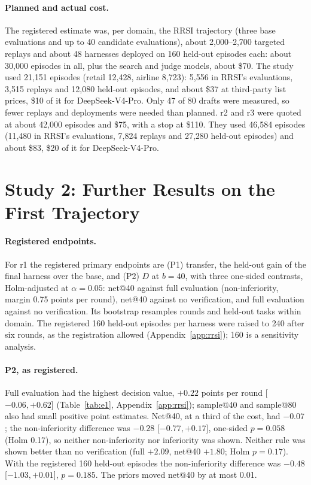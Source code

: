 \documentclass[11pt]{article}
\begin{document}
\paragraph{Planned and actual cost.} The registered estimate was, per domain, the RRSI trajectory (three base evaluations and up to 40 candidate evaluations), about 2{,}000--2{,}700 targeted replays and about 48 harnesses deployed on 160 held-out episodes each: about 30{,}000 episodes in all, plus the search and judge models, about \$70. The study used 21{,}151 episodes (retail 12{,}428, airline 8{,}723): 5{,}556 in RRSI's evaluations, 3{,}515 replays and 12{,}080 held-out episodes, and about \$37 at third-party list prices, \$10 of it for DeepSeek-V4-Pro. Only 47 of 80 drafts were measured, so fewer replays and deployments were needed than planned. r2 and r3 were quoted at about 42{,}000 episodes and \$75, with a stop at \$110. They used 46{,}584 episodes (11{,}480 in RRSI's evaluations, 7{,}824 replays and 27{,}280 held-out episodes) and about \$83, \$20 of it for DeepSeek-V4-Pro.


\section{Study 2: Further Results on the First Trajectory}
\label{app:r1}

\paragraph{Registered endpoints.} For r1 the registered primary endpoints are (P1) transfer, the held-out gain of the final harness over the base, and (P2) $D$ at $b=40$, with three one-sided contrasts, Holm-adjusted at $\alpha=0.05$: net@40 against full evaluation (non-inferiority, margin 0.75 points per round), net@40 against no verification, and full evaluation against no verification. Its bootstrap resamples rounds and held-out tasks within domain. The registered 160 held-out episodes per harness were raised to 240 after six rounds, as the registration allowed (Appendix~\ref{app:rrsi}); 160 is a sensitivity analysis.

\paragraph{P2, as registered.} Full evaluation had the highest decision value, $+0.22$ points per round [$-0.06,+0.62$] (Table~\ref{tab:e1}, Appendix~\ref{app:rrsi}); sample@40 and sample@80 also had small positive point estimates. Net@40, at a third of the cost, had $-0.07$; the non-inferiority difference was $-0.28$ [$-0.77,+0.17$], one-sided $p=0.058$ (Holm 0.17), so neither non-inferiority nor inferiority was shown. Neither rule was shown better than no verification (full $+2.09$, net@40 $+1.80$; Holm $p=0.17$). With the registered 160 held-out episodes the non-inferiority difference was $-0.48$ [$-1.03,+0.01$], $p=0.185$. The priors moved net@40 by at most 0.01.
\end{document}
